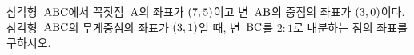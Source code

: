 삼각형~$\mathrm{ABC}$에서 꼭짓점~$\mathrm{A}$의 좌표가 $(7{,}\mkern3mu\mathopen{}5)$이고 변~$\mathrm{AB}$의 중점의 좌표가 $(3{,}\mkern3mu\mathopen{}0)$이다. 삼각형~$\mathrm{ABC}$의 무게중심의 좌표가 $(3{,}\mkern3mu\mathopen{}1)$일 때, 변~$\mathrm{BC}$를 $2:1$로 내분하는 점의 좌표를 구하시오.
